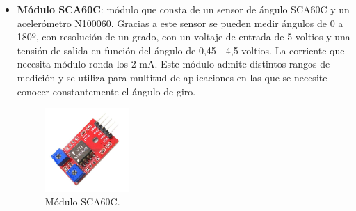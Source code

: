 \begin{itemize}
    \item \textbf{Módulo SCA60C}\cite{SCA60C}: módulo que consta de un sensor de ángulo SCA60C y un acelerómetro N100060. Gracias a este sensor se pueden medir ángulos de 0 a 180º, con resolución de un grado, con un voltaje de entrada de 5 voltios y una tensión de salida en función del ángulo de 0,45 - 4,5 voltios. La corriente que necesita módulo ronda los 2 mA. Este módulo admite distintos rangos de medición y se utiliza para multitud de aplicaciones en las que se necesite conocer constantemente el ángulo de giro. 
\begin{figure}[h!]
    \centering
    \includegraphics[width=0.3\textwidth]{img/imgSCA60C.jpg}
    \caption{Módulo SCA60C\cite{imgSCA60C}.}
    \label{fig:SCA60C} %
\end{figure}


\end{itemize}

